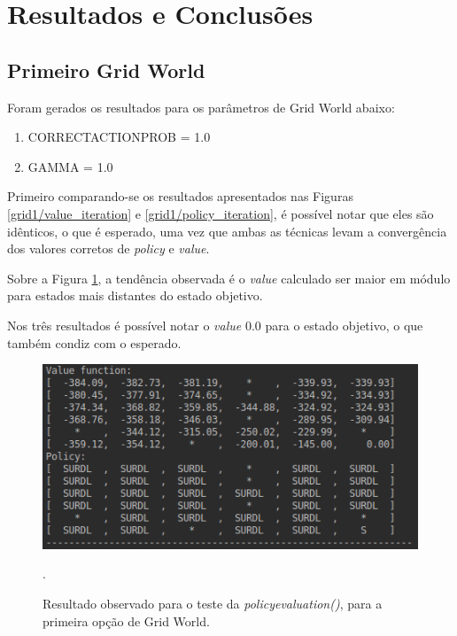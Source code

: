 \documentclass[conference]{IEEEtran}
\begin{document}
\section{Resultados e Conclusões}

\subsection{Primeiro Grid World}
Foram gerados os resultados para os parâmetros de Grid World abaixo:

\begin{enumerate}
\item CORRECT\underline{\space}ACTION\underline{\space}PROB = 1.0

\item GAMMA = 1.0
\end{enumerate}

Primeiro comparando-se os resultados apresentados nas Figuras \ref{grid1/value_iteration} e \ref{grid1/policy_iteration}, é possível notar que eles são idênticos, o que é esperado, uma vez que ambas as técnicas levam a convergência dos valores corretos de \textit{policy} e \textit{value}.

Sobre a Figura \ref{grid1/policy_evaluation}, a tendência observada é o \textit{value} calculado ser maior em módulo para estados mais distantes do estado objetivo.

Nos três resultados é possível notar o \textit{value} 0.0 para o estado objetivo, o que também condiz com o esperado. 

\begin{figure}[htbp]
\centering
\centerline{\includegraphics[scale=0.5]{imagens/grid1/policy_evaluation.png}}
\caption{Resultado observado para o teste da \textit{policy\underline{\space}evaluation()}, para a primeira opção de Grid World.}.
\label{grid1/policy_evaluation}
\end{figure}
\end{document}
